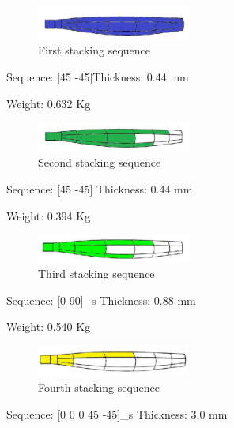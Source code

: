\begin{figure}[H]
  \includegraphics[width=0.45\textwidth]{p7}
\caption{First stacking sequence  }
\label{fig:14}       %
\end{figure}
Sequence: [45  -45]\hspace{1cm}Thickness: 0.44 mm

\hspace{2cm}Weight: 0.632 Kg

\begin{figure}[H]
  \includegraphics[width=0.45\textwidth]{p8}
\caption{Second stacking sequence  }
\label{fig:15}       %
\end{figure}
Sequence: [45  -45]	\hspace{1cm}Thickness: 0.44 mm

\hspace{2cm}Weight: 0.394 Kg
\begin{figure}[H]
  \includegraphics[width=0.45\textwidth]{p9}
\caption{Third stacking sequence  }
\label{fig:16}       %
\end{figure}
Sequence: [0  90]_s	\hspace{1cm}Thickness: 0.88 mm 

\hspace{2cm}Weight: 0.540 Kg
\begin{figure}[H]
  \includegraphics[width=0.45\textwidth]{p10}
\caption{Fourth stacking sequence  }
\label{fig:17}       %
\end{figure}
Sequence: [0 0 0 45 -45]_s	\hspace{1cm}Thickness: 3.0 mm 

